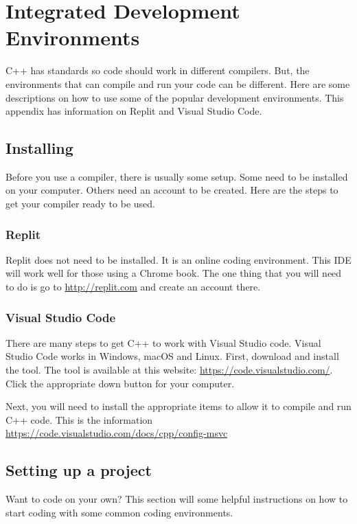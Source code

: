 

\chapter{Integrated Development Environments}
C++ has standards so code should work in different compilers. But, the 
environments that can compile and run your code can be different. Here
are some descriptions on how to use some of the popular development
environments. This appendix has information on Replit and Visual Studio Code.
\section{Installing}
\label{installide}
Before you use a compiler, there is usually some setup. Some need to
be installed on your computer. Others need an account to be created.
Here are the steps to get your compiler ready to be used.
\subsection{Replit}
Replit does not need to be installed. It is an online coding environment.
This IDE will work well for those using a Chrome book. The one thing that you will need to do is go to \url{http://replit.com} and create an 
account there.
\subsection{Visual Studio Code}
There are many steps to get C++ to work with Visual Studio code. Visual Studio Code works in Windows, macOS and Linux. First,
download and install the tool. The tool is available at this 
website: \url{https://code.visualstudio.com/}. Click the appropriate
down button for your computer.

Next, you will need to install the appropriate items to allow it
to compile and run C++ code. This is the information \url{https://code.visualstudio.com/docs/cpp/config-msvc }

\section{Setting up a project}
\label{setupproject}
Want to code on your own? This section will some helpful instructions on
how to start coding with some common coding environments.
